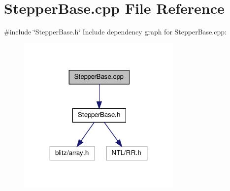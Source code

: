 \section{\-Stepper\-Base.\-cpp \-File \-Reference}
\label{_stepper_base_8cpp}
{\ttfamily \#include \char`\"{}\-Stepper\-Base.\-h\char`\"{}}\*
\-Include dependency graph for \-Stepper\-Base.\-cpp\-:
\nopagebreak
\begin{figure}[H]
\begin{center}
\leavevmode
\includegraphics[width=228pt]{_stepper_base_8cpp__incl}
\end{center}
\end{figure}
